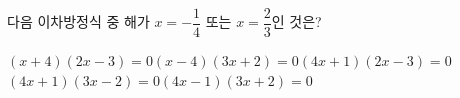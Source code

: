 다음 이차방정식 중 해가 $x=-\dfrac{1}{4}$ 또는 $x=\dfrac{2}{3}$인 것은?
\begin{choicesv}{$(x+4)(2x-3)=0$}{$(x-4)(3x+2)=0$}{$(4x+1)(2x-3)=0$}{$(4x+1)(3x-2)=0$}{$(4x-1)(3x+2)=0$}\end{choicesv}
